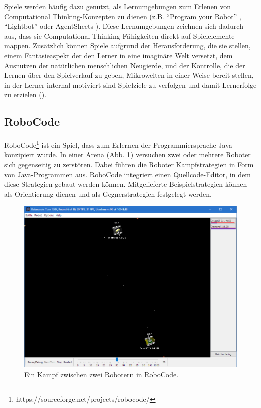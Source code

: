 Spiele werden häufig dazu genutzt, als Lernumgebungen zum Erlenen von Computational
Thinking-Konzepten zu dienen (z.B. \enquote{Program your Robot} \cite{kazimoglu_serious_2012},
\enquote{Lightbot} \cite{gouws2013computational} oder AgentSheets \cite{repenning2010scalable}). Diese Lernumgebungen zeichnen sich dadurch aus, dass sie Computational Thinking-Fähigkeiten direkt auf Spielelemente mappen. Zusätzlich können Spiele aufgrund der Herausforderung, die sie stellen, einem Fantasieaspekt der den Lerner in
eine imaginäre Welt versetzt, dem Ausnutzen der natürlichen menschlichen Neugierde, und der
Kontrolle, die der Lernen über den Spielverlauf zu geben, Mikrowelten in einer Weise bereit stellen,
in der Lerner internal motiviert sind Spielziele zu verfolgen und damit Lernerfolge zu erzielen
(\cite{rieber_seriously_1996}).

\subsection{RoboCode}

RoboCode\footnote{https://sourceforge.net/projects/robocode/} ist ein Spiel, dass zum Erlernen der
Programmiersprache Java konzipiert wurde. In einer Arena (Abb. \ref{robocode}) versuchen zwei oder mehrere Roboter sich
gegenseitig zu zerstören. Dabei führen die Roboter Kampfstrategien in Form von Java-Programmen aus.
RoboCode integriert einen Quellcode-Editor, in dem diese Strategien gebaut werden können.
Mitgelieferte Beispielstrategien können als Orientierung dienen und als Gegnerstrategien festgelegt
werden.

\begin{figure}
  \caption{Ein Kampf zwischen zwei Robotern in RoboCode.}

  \label{robocode}
  
  \includegraphics{figures/RoboCode.png}
\end{figure}

